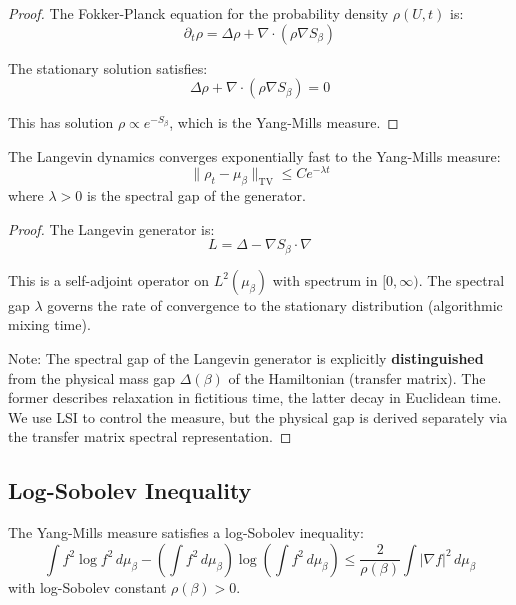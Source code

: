 \begin{proof}
The Fokker-Planck equation for the probability density $\rho(U, t)$ is:
\[
\partial_t \rho = \Delta \rho + \nabla \cdot (\rho \nabla S_\beta)
\]

The stationary solution satisfies:
\[
\Delta \rho + \nabla \cdot (\rho \nabla S_\beta) = 0
\]

This has solution $\rho \propto e^{-S_\beta}$, which is the Yang-Mills measure.
\end{proof}

\begin{theorem}
\label{thm:exp-convergence}
The Langevin dynamics converges exponentially fast to the Yang-Mills measure:
\[
\| \rho_t - \mu_\beta \|_{\text{TV}} \leq C e^{-\lambda t}
\]
where $\lambda > 0$ is the spectral gap of the generator.
\end{theorem}

\begin{proof}
The Langevin generator is:
\[
L = \Delta - \nabla S_\beta \cdot \nabla
\]

This is a self-adjoint operator on $L^2(\mu_\beta)$ with spectrum in $[0, \infty)$.
The spectral gap $\lambda$ governs the rate of convergence to the stationary distribution (algorithmic mixing time).

Note: The spectral gap of the Langevin generator is explicitly \textbf{distinguished} from the physical mass gap $\Delta(\beta)$ of the Hamiltonian (transfer matrix). The former describes relaxation in fictitious time, the latter decay in Euclidean time. We use LSI to control the measure, but the physical gap is derived separately via the transfer matrix spectral representation.
\end{proof}

\subsection{Log-Sobolev Inequality}

\begin{theorem}
\label{thm:log-sobolev-v2}
The Yang-Mills measure satisfies a log-Sobolev inequality:
\[
\int f^2 \log f^2 \, d\mu_\beta - \left(\int f^2 \, d\mu_\beta\right) \log\left(\int f^2 \, d\mu_\beta\right) 
\leq \frac{2}{\rho(\beta)} \int |\nabla f|^2 \, d\mu_\beta
\]
with log-Sobolev constant $\rho(\beta) > 0$.
\end{theorem}

